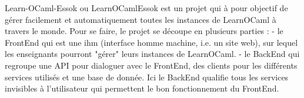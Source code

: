 \documentclass{article}
\begin{document}
Learn-OCaml-Essok ou LearnOCamlEssok est un projet qui à pour objectif de gérer facilement et automatiquement toutes les instances de LearnOCaml à travers le monde.
\newline
Pour se faire, le projet se découpe en plusieurs parties :
\newline
\newline
- le FrontEnd qui est une ihm (interface homme machine, i.e. un site web), sur lequel les enseignants pourront "gérer" leurs instances de LearnOCaml.
\newline
\newline
- le BackEnd qui regroupe une API pour dialoguer avec le FrontEnd, des clients pour les différents services utilisés et une base de donnée.
\newline
\newline
Ici le BackEnd qualifie tous les services invisibles à l'utilisateur qui permettent le bon fonctionnement du FrontEnd.
\newpage
\end{document}
